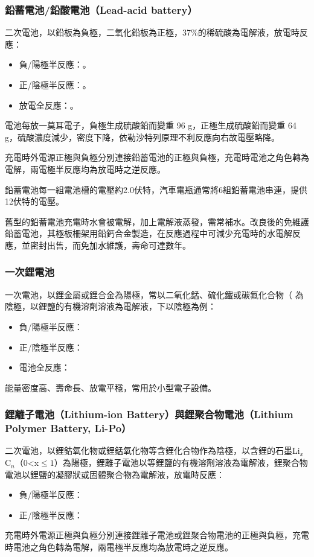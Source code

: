\documentclass[a4paper,12pt]{report}
\begin{document}
\begin{itemize}
\subsubsection{鉛蓄電池/鉛酸電池（Lead-acid battery）}
二次電池，以鉛板為負極，二氧化鉛板為正極，37\%的稀硫酸為電解液，放電時反應：
\begin{itemize}
\item 負/陽極半反應：。
\item 正/陰極半反應：。
\item 放電全反應：。
\end{itemize}
電池每放一莫耳電子，負極生成硫酸鉛而變重 96 g，正極生成硫酸鉛而變重 64 g，硫酸濃度減少，密度下降，依勒沙特列原理不利反應向右故電壓略降。

充電時外電源正極與負極分別連接鉛蓄電池的正極與負極，充電時電池之角色轉為電解，兩電極半反應均為放電時之逆反應。

鉛蓄電池每一組電池槽的電壓約2.0伏特，汽車電瓶通常將6組鉛蓄電池串連，提供12伏特的電壓。

舊型的鉛蓄電池充電時水會被電解，加上電解液蒸發，需常補水。改良後的免維護鉛蓄電池，其極板柵架用鉛鈣合金製造，在反應過程中可減少充電時的水電解反應，並密封出售，而免加水維護，壽命可達數年。
\subsubsection{一次鋰電池}
一次電池，以鋰金屬或鋰合金為陽極，常以二氧化錳、硫化鐵或碳氟化合物（
為陰極，以鋰鹽的有機溶劑溶液為電解液，下以陰極為例：
\begin{itemize}
\item 負/陽極半反應：
\item 正/陰極半反應：
\item 電池全反應：
\end{itemize}
能量密度高、壽命長、放電平穩，常用於小型電子設備。
\subsubsection{鋰離子電池（Lithium-ion Battery）與鋰聚合物電池（Lithium Polymer Battery, Li-Po）}
二次電池，以鋰鈷氧化物或鋰錳氧化物等含鋰化合物作為陰極，以含鋰的石墨Li$_x$C$_n$（0<x$\leq 1$）為陽極，鋰離子電池以等鋰鹽的有機溶劑溶液為電解液，鋰聚合物電池以鋰鹽的凝膠狀或固體聚合物為電解液，放電時反應：
\begin{itemize}
\item 負/陽極半反應：
\item 正/陰極半反應：
\end{itemize}
充電時外電源正極與負極分別連接鋰離子電池或鋰聚合物電池的正極與負極，充電時電池之角色轉為電解，兩電極半反應均為放電時之逆反應。


\end{itemize}
\end{document}
